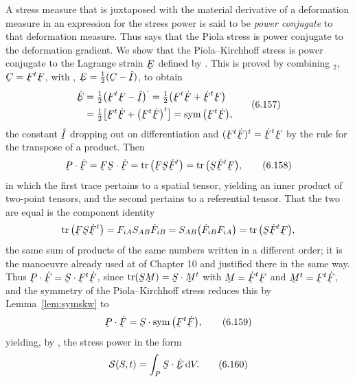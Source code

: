 A stress measure that is juxtaposed with the material derivative of a
deformation measure in an expression for the stress power is said to be
\emph{power conjugate} to that deformation measure. Thus 
says that the Piola stress is power conjugate to the deformation
gradient. We show that the Piola--Kirchhoff stress is power conjugate
to the Lagrange strain $\bE$ defined by . This is proved by
combining $_{2}$, $\bC=\bF^{t}\bF$, with ,
$\bE=\tfrac12(\bC-\hI)$, to obtain
\begin{equation}
\begin{aligned}
   \dot\bE&=\tfrac12\big(\bF^{t}\bF-\hI\big)^{\textstyle\cdot}
    =\tfrac12\big(\bF^{t}\dot\bF+\dot\bF^{t}\bF\big)\\
   &=\tfrac12\big[\bF^{t}\dot\bF+\big(\bF^{t}\dot\bF\big)^{t}\big]
    =\Sym\big(\bF^{t}\dot\bF\big),
\end{aligned}
   \tag{6.157}\label{eq:6.157}
\end{equation}
the constant $\hI$ dropping out on differentiation and
$(\bF^{t}\dot\bF)^{t}=\dot\bF^{t}\bF$ by the rule for the transpose of
a product. Then
\begin{equation}
   \bP\cdot\dot\bF=\bF\bS\cdot\dot\bF
   =\tr\big(\bF\bS\dot\bF^{t}\big)=\tr\big(\bS\dot\bF^{t}\bF\big),
   \tag{6.158}\label{eq:6.158}
\end{equation}
in which the first trace pertains to a spatial tensor, yielding an
inner product of two-point tensors, and the second pertains to a
referential tensor. That the two are equal is the component identity
\[
   \tr\big(\bF\bS\dot\bF^{t}\big)=F_{iA}S_{AB}\dot F_{iB}
   =S_{AB}\big(\dot F_{iB}F_{iA}\big)=\tr\big(\bS\dot\bF^{t}\bF\big),
\]
the same sum of products of the same numbers written in a different
order; it is the manoeuvre already used at  of Chapter 10
and justified there in the same way. Thus
$\bP\cdot\dot\bF=\bS\cdot\bF^{t}\dot\bF$, since
$\tr(\bS\bM)=\bS\cdot\bM^{t}$ with $\bM=\dot\bF^{t}\bF$ and
$\bM^{t}=\bF^{t}\dot\bF$, and the symmetry of the Piola--Kirchhoff
stress reduces this by Lemma~\ref{lem:symskw} to
\begin{equation}
   \bP\cdot\dot\bF=\bS\cdot\Sym\big(\bF^{t}\dot\bF\big),
   \tag{6.159}\label{eq:6.159}
\end{equation}
yielding, by , the stress power in the form
\begin{equation}
   \mathcal{S}(S,t)=\int_{P}\bS\cdot\dot\bE\,\dl V .
   \tag{6.160}\label{eq:6.160}
\end{equation}

